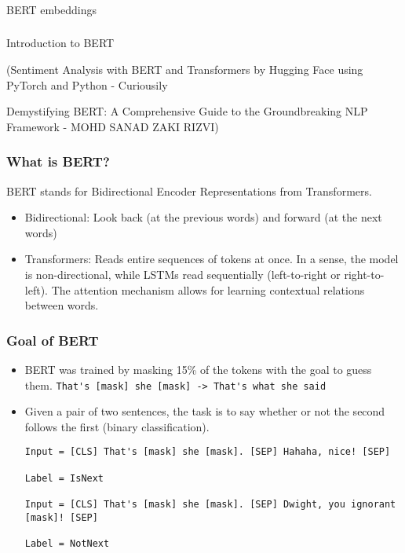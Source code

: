 \begin{frame}[fragile]\frametitle{}

\begin{center}
{\Large BERT embeddings}

\end{center}
\end{frame}

\begin{frame}[fragile]\frametitle{}

\begin{center}
{\Large Introduction to BERT}

{\tiny (Sentiment Analysis with BERT and Transformers by Hugging Face using PyTorch and Python - Curiousily  

Demystifying BERT: A Comprehensive Guide to the Groundbreaking NLP Framework - 
MOHD SANAD ZAKI RIZVI)}

\end{center}
\end{frame}

\begin{frame}[fragile]\frametitle{What is BERT?}
BERT stands for Bidirectional Encoder Representations from Transformers.

\begin{itemize}
\item Bidirectional: Look back (at the previous words) and forward (at the next words)
\item Transformers: Reads entire sequences of tokens at once. In a sense, the model is non-directional, while LSTMs read sequentially (left-to-right or right-to-left). The attention mechanism allows for learning contextual relations between words.
\end{itemize}
\end{frame}

\begin{frame}[fragile]\frametitle{Goal of BERT}

\begin{itemize}
\item BERT was trained by masking 15\% of the tokens with the goal to guess them. \lstinline|That's [mask] she [mask] -> That's what she said|
\item Given a pair of two sentences, the task is to say whether or not the second follows the first (binary classification).
\begin{lstlisting}
Input = [CLS] That's [mask] she [mask]. [SEP] Hahaha, nice! [SEP]

Label = IsNext

Input = [CLS] That's [mask] she [mask]. [SEP] Dwight, you ignorant [mask]! [SEP]

Label = NotNext
\end{lstlisting}

\end{itemize}
\end{frame}

